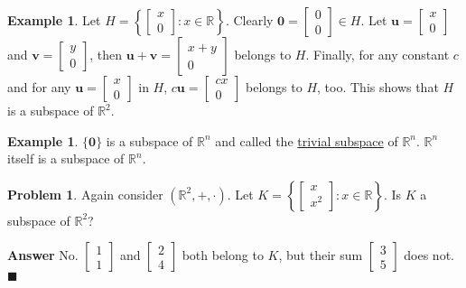 \documentclass[12pt,letterpaper]{book}
\numberwithin{equation}{section}
\theoremstyle{definition}
\newtheorem{problem}[thm]{\textbf{Problem}}
\newtheorem{example}[thm]{\textbf{Example}}
\newenvironment{answer}{\noindent\textbf{Answer}}{\hfill$\blacksquare$\vspace{0.1in}}
\newcommand{\vu}{\bm{u}}
\newcommand{\vv}{\bm{v}}
\newcommand{\veczero}{\bm{0}}
\begin{document}
\begin{example} Let $H=\left\{\left[\begin{array}{r} x \\ 0 \end{array}\right]:x\in
\mathbb{R}\right\}$. Clearly $\veczero =\left[\begin{array}{r} 0 \\ 0 \end{array}\right] \in H$. Let $\vu=\left[\begin{array}{r} x \\ 0 \end{array}\right]$ and $\vv=\left[\begin{array}{r} y \\ 0 \end{array}\right]$, then $\vu+\vv=\left[\begin{array}{c} x+y \\ 0 \end{array}\right]$ belongs to $H$. Finally, for any constant $c$ and for any $\vu=\left[\begin{array}{r} x \\ 0 \end{array}\right]$ in $H$, $c\vu=\left[\begin{array}{c} cx \\ 0 \end{array}\right]$ belongs to $H$, too. This shows that $H$ is a subspace of $\mathbb{R}^2$.
\end{example}

\begin{example}
$\{\veczero\}$ is a subspace of $\mathbb{R}^n$ and called the \underline{trivial subspace} of $\mathbb{R}^n$. $\mathbb{R}^n$ itself is a subspace of $\mathbb{R}^n$.
\end{example}

\begin{problem} Again consider $(\mathbb{R}^2,+,\cdot)$. Let
$K=\left\{\left[\begin{array}{c} x \\ x^2 \end{array}\right]:x\in
\mathbb{R}\right\}$. Is $K$ a subspace of
$\mathbb{R}^2$?
\end{problem}

\begin{answer}
No. $\left[\begin{array}{c} 1 \\ 1 \end{array}\right]$ and $\left[\begin{array}{c} 2 \\ 4 \end{array}\right]$ both belong to $K$, but their sum $\left[\begin{array}{c} 3 \\ 5 \end{array}\right]$ does not.
\end{answer}
\end{document}
